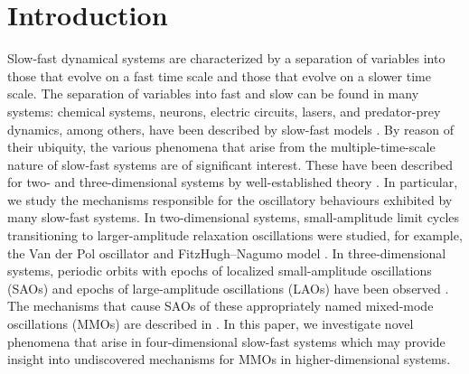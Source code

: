 \documentclass{ws-ijbc}
\begin{document}
\section{Introduction}
Slow-fast dynamical systems are characterized by a separation of variables into those that evolve on a fast time scale and those that evolve on a slower time scale.  The separation of variables into fast and slow can be found in many systems: chemical systems, neurons, electric circuits, lasers, and predator-prey dynamics, among others, have been described by slow-fast models  \cite{BZ_reaction, Neurons,Circuits, lasers, Predator-Prey}.  By reason of their ubiquity, the various phenomena that arise from the multiple-time-scale nature of slow-fast systems are of significant interest. These have been described for two- and three-dimensional systems by well-established theory \cite{canard_explosion, lents-rapides, enlacement,singular_hopf, folded_node,three}.  In particular, we study the mechanisms responsible for the oscillatory behaviours exhibited by many slow-fast systems.  In two-dimensional systems, small-amplitude limit cycles transitioning to larger-amplitude relaxation oscillations were studied, for example, the Van der Pol oscillator and FitzHugh--Nagumo model \cite{canard_explosion, fitz-hugh-nagumo}.  In three-dimensional systems, periodic orbits with epochs of localized small-amplitude oscillations (SAOs) and epochs of large-amplitude oscillations (LAOs) have been observed \cite{BZ}.  The mechanisms that cause SAOs of these appropriately named mixed-mode oscillations (MMOs) are described in \cite{MMO}.  In this paper, we investigate novel phenomena that arise in four-dimensional slow-fast systems which may provide insight into undiscovered mechanisms for MMOs in higher-dimensional systems.
\end{document}
